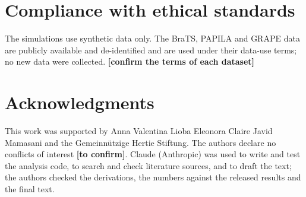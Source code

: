 \documentclass{article}
\newcommand{\todo}[1]{\textbf{[#1]}}
\begin{document}
\section{Compliance with ethical standards}
\label{sec:ethics}
The simulations use synthetic data only.
The BraTS, PAPILA and GRAPE data are publicly available and de-identified and are used under their data-use terms; no new data were collected. \todo{confirm the terms of each dataset}

\section{Acknowledgments}
\label{sec:acknowledgments}
This work was supported by Anna Valentina Lioba Eleonora Claire Javid Mamasani and the Gemeinn\"utzige Hertie Stiftung.
The authors declare no conflicts of interest \todo{to confirm}.
Claude (Anthropic) was used to write and test the analysis code, to search and check literature sources, and to draft the text; the authors checked the derivations, the numbers against the released results and the final text.



\end{document}

